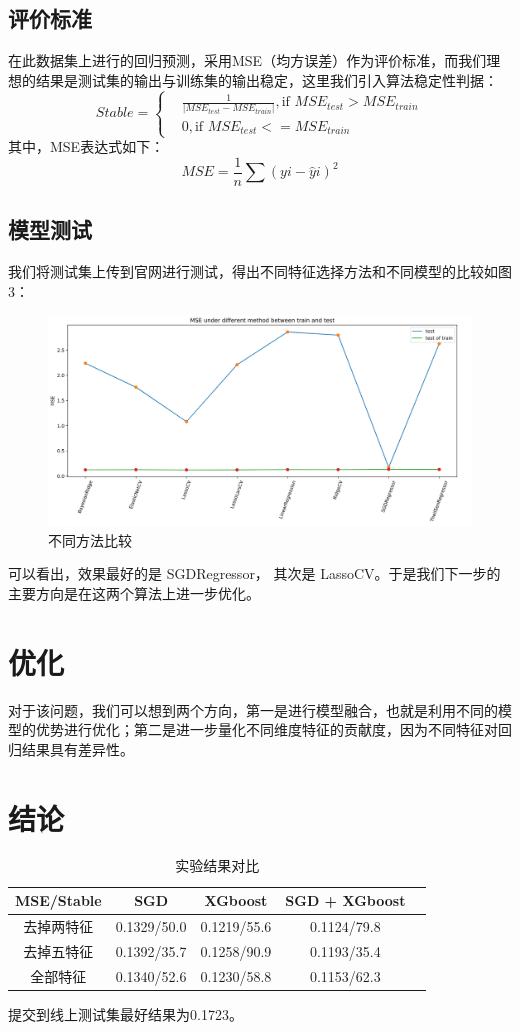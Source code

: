 \documentclass{cjc}
\begin{document}
\subsection{评价标准}
在此数据集上进行的回归预测，采用MSE（均方误差）作为评价标准，而我们理想的结果是测试集的输出与训练集的输出稳定，这里我们引入算法稳定性判据：
$$
Stable=\begin{cases}
 & \frac{1}{\left |MSE_{test}-MSE_{train} \right |},\text{if }MSE_{test}>MSE_{train} \\ 
 & 0,\text{if }MSE_{test}<= MSE_{train}
\end{cases}
$$
其中，MSE表达式如下：
$$
M S E=\frac{1}{n} \sum (y i-\hat{y} i)^{2}
$$

\subsection{模型测试}
我们将测试集上传到官网进行测试，得出不同特征选择方法和不同模型的比较如图3：
\begin{figure}[htb]
  \centering
  \includegraphics[width=\linewidth]{fig/comparison_test.png}
  \caption{不同方法比较}
\end{figure}
可以看出，效果最好的是 SGDRegressor， 其次是 LassoCV。于是我们下一步的主要方向是在这两个算法上进一步优化。
\section{优化}
对于该问题，我们可以想到两个方向，第一是进行模型融合，也就是利用不同的模型的优势进行优化；第二是进一步量化不同维度特征的贡献度，因为不同特征对回归结果具有差异性。
\section{结论}


\begin{table}[htb]
\begin{center}
\caption{实验结果对比}
\small
\begin{tabular}{@{}ccccc@{}}
\toprule
MSE/Stable      & SGD & XGboost& SGD + XGboost \\ \midrule
去掉两特征 & 0.1329/50.0       & 0.1219/55.6 & 0.1124/79.8   \\ \midrule \midrule
去掉五特征 & 0.1392/35.7        & 0.1258/90.9  & 0.1193/35.4 \\ \midrule
全部特征  & 0.1340/52.6       & 0.1230/58.8   & 0.1153/62.3\\ \midrule
\bottomrule
\end{tabular}
\end{center}
\end{table}
提交到线上测试集最好结果为0.1723。
\end{document}
